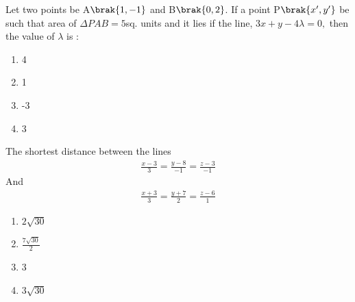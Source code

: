 \iffalse
    \title{2020}
    \author{EE24BTECH11001}
    \section{mcq-single}
\fi
	\item
		Let two points be A$\brak{1, -1}$ and B$\brak{0, 2}$. If a point P$\brak{x', y'}$ be
		such that area of $\Delta PAB = 5$sq. units and it lies if the line, $3x + y - 4\lambda = 0,$ then
		the value of $\lambda$ is :
		\hfill{}
	\begin{multicols}{4}
		\begin{enumerate}
			\item 4 
			\columnbreak
			\item 1
			\columnbreak
			\item -3
			\columnbreak
			\item 3
		\end{enumerate}
	\end{multicols}

	\item The shortest distance between the lines
		\begin{align*}
		\frac{x-3}{3} = \frac{y-8}{-1} = \frac{z-3}{-1}
		\end{align*} And
		\begin{align}
			\frac{x+3}{3} = \frac{y+7}{2} = \frac{z-6}{1}
		\end{align}
		\hfill{}
	\begin{multicols}{4}
		\begin{enumerate}
			\item $2\sqrt{30}$ \columnbreak
			\item $\frac{7\sqrt{30}}{2}$ \columnbreak
			\item 3 \columnbreak
			\item $3\sqrt{30}$
		\end{enumerate}
	\end{multicols}


